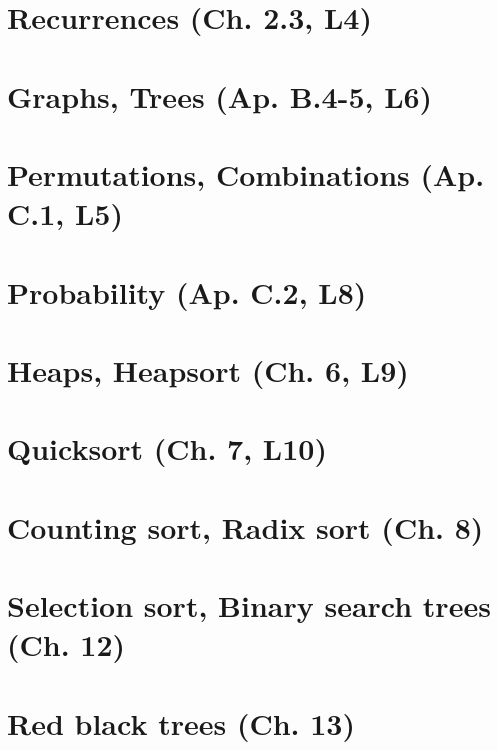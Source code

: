 \documentclass{article}
\begin{document}
\section{Recurrences (Ch. 2.3, L4)} %


\section{Graphs, Trees (Ap. B.4-5, L6)} %


\section{Permutations, Combinations (Ap. C.1, L5)} %


\section{Probability (Ap. C.2, L8)} %



\section{Heaps, Heapsort (Ch. 6, L9)} %


\section{Quicksort (Ch. 7, L10)} %


\section{Counting sort, Radix sort (Ch. 8)}



\section{Selection sort, Binary search trees (Ch. 12)}


\section{Red black trees (Ch. 13)}

\end{document}
